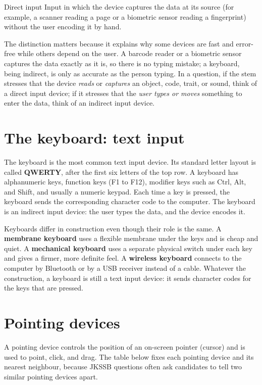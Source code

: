 \begin{definitionbox}{Direct input}
Input in which the device captures the data at its source (for example, a
scanner reading a page or a biometric sensor reading a fingerprint) without
the user encoding it by hand.
\end{definitionbox}

The distinction matters because it explains why some devices are fast and
error-free while others depend on the user. A barcode reader or a biometric
sensor captures the data exactly as it is, so there is no typing mistake; a
keyboard, being indirect, is only as accurate as the person typing. In a
question, if the stem stresses that the device \emph{reads} or \emph{captures}
an object, code, trait, or sound, think of a direct input device; if it
stresses that the \emph{user types or moves} something to enter the data,
think of an indirect input device.

\section{The keyboard: text input}
The keyboard is the most common text input device. Its standard letter
layout is called \textbf{QWERTY}, after the first six letters of the top row.
A keyboard has alphanumeric keys, function keys (F1 to F12), modifier keys
such as Ctrl, Alt, and Shift, and usually a numeric keypad. Each time a key
is pressed, the keyboard sends the corresponding character code to the
computer. The keyboard is an indirect input device: the user types the data,
and the device encodes it.

Keyboards differ in construction even though their role is the same. A
\textbf{membrane keyboard} uses a flexible membrane under the keys and is
cheap and quiet. A \textbf{mechanical keyboard} uses a separate physical
switch under each key and gives a firmer, more definite feel. A
\textbf{wireless keyboard} connects to the computer by Bluetooth or by a USB
receiver instead of a cable. Whatever the construction, a keyboard is still a
text input device: it sends character codes for the keys that are pressed.

\section{Pointing devices}
A pointing device controls the position of an on-screen pointer (cursor) and
is used to point, click, and drag. The table below fixes each pointing device
and its nearest neighbour, because JKSSB questions often ask candidates to
tell two similar pointing devices apart.

